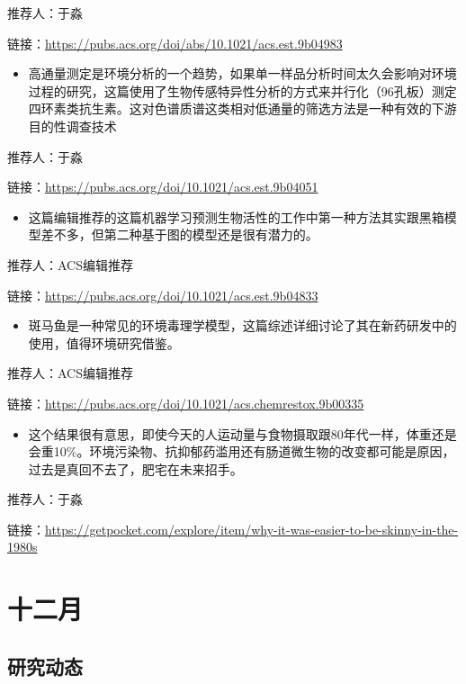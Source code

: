 \documentclass[
]{book}
\providecommand{\tightlist}{%
  \setlength{\itemsep}{0pt}\setlength{\parskip}{0pt}}
\begin{document}
推荐人：于淼

链接：\url{https://pubs.acs.org/doi/abs/10.1021/acs.est.9b04983}

\begin{itemize}
\tightlist
\item
  高通量测定是环境分析的一个趋势，如果单一样品分析时间太久会影响对环境过程的研究，这篇使用了生物传感特异性分析的方式来并行化（96孔板）测定四环素类抗生素。这对色谱质谱这类相对低通量的筛选方法是一种有效的下游目的性调查技术
\end{itemize}

推荐人：于淼

链接：\url{https://pubs.acs.org/doi/10.1021/acs.est.9b04051}

\begin{itemize}
\tightlist
\item
  这篇编辑推荐的这篇机器学习预测生物活性的工作中第一种方法其实跟黑箱模型差不多，但第二种基于图的模型还是很有潜力的。
\end{itemize}

推荐人：ACS编辑推荐

链接：\url{https://pubs.acs.org/doi/10.1021/acs.est.9b04833}

\begin{itemize}
\tightlist
\item
  斑马鱼是一种常见的环境毒理学模型，这篇综述详细讨论了其在新药研发中的使用，值得环境研究借鉴。
\end{itemize}

推荐人：ACS编辑推荐

链接：\url{https://pubs.acs.org/doi/10.1021/acs.chemrestox.9b00335}

\begin{itemize}
\tightlist
\item
  这个结果很有意思，即使今天的人运动量与食物摄取跟80年代一样，体重还是会重10\%。环境污染物、抗抑郁药滥用还有肠道微生物的改变都可能是原因，过去是真回不去了，肥宅在未来招手。
\end{itemize}

推荐人：于淼

链接：\url{https://getpocket.com/explore/item/why-it-was-easier-to-be-skinny-in-the-1980s}

\hypertarget{ux5341ux4e8cux6708-2}{%
\section*{十二月}\label{ux5341ux4e8cux6708-2}}

\hypertarget{ux7814ux7a76ux52a8ux6001-25}{%
\subsection*{研究动态}\label{ux7814ux7a76ux52a8ux6001-25}}
\end{document}
